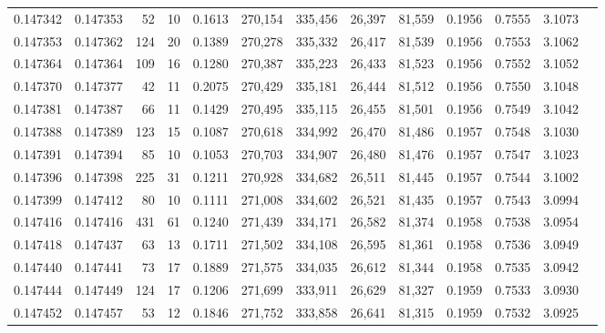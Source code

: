 \begin{tabular}{rrrrrrrrrrrrr}
0.147342 & 0.147353 &    52 &  10 &                                     0.1613 & 270,154 & 335,456 &  26,397 &  81,559 & 0.1956 & 0.7555 & 3.1073 \\
0.147353 & 0.147362 &   124 &  20 &                                     0.1389 & 270,278 & 335,332 &  26,417 &  81,539 & 0.1956 & 0.7553 & 3.1062 \\
0.147364 & 0.147364 &   109 &  16 &                                     0.1280 & 270,387 & 335,223 &  26,433 &  81,523 & 0.1956 & 0.7552 & 3.1052 \\
0.147370 & 0.147377 &    42 &  11 &                                     0.2075 & 270,429 & 335,181 &  26,444 &  81,512 & 0.1956 & 0.7550 & 3.1048 \\
0.147381 & 0.147387 &    66 &  11 &                                     0.1429 & 270,495 & 335,115 &  26,455 &  81,501 & 0.1956 & 0.7549 & 3.1042 \\
0.147388 & 0.147389 &   123 &  15 &                                     0.1087 & 270,618 & 334,992 &  26,470 &  81,486 & 0.1957 & 0.7548 & 3.1030 \\
0.147391 & 0.147394 &    85 &  10 &                                     0.1053 & 270,703 & 334,907 &  26,480 &  81,476 & 0.1957 & 0.7547 & 3.1023 \\
0.147396 & 0.147398 &   225 &  31 &                                     0.1211 & 270,928 & 334,682 &  26,511 &  81,445 & 0.1957 & 0.7544 & 3.1002 \\
0.147399 & 0.147412 &    80 &  10 &                                     0.1111 & 271,008 & 334,602 &  26,521 &  81,435 & 0.1957 & 0.7543 & 3.0994 \\
0.147416 & 0.147416 &   431 &  61 &                                     0.1240 & 271,439 & 334,171 &  26,582 &  81,374 & 0.1958 & 0.7538 & 3.0954 \\
0.147418 & 0.147437 &    63 &  13 &                                     0.1711 & 271,502 & 334,108 &  26,595 &  81,361 & 0.1958 & 0.7536 & 3.0949 \\
0.147440 & 0.147441 &    73 &  17 &                                     0.1889 & 271,575 & 334,035 &  26,612 &  81,344 & 0.1958 & 0.7535 & 3.0942 \\
0.147444 & 0.147449 &   124 &  17 &                                     0.1206 & 271,699 & 333,911 &  26,629 &  81,327 & 0.1959 & 0.7533 & 3.0930 \\
0.147452 & 0.147457 &    53 &  12 &                                     0.1846 & 271,752 & 333,858 &  26,641 &  81,315 & 0.1959 & 0.7532 & 3.0925 \\

\end{tabular}
